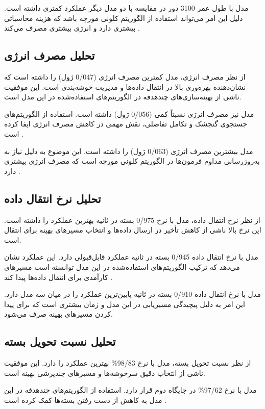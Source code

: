 \documentclass[12pt, onecolumn, a4paper]{article}
\begin{document}
مدل  با طول عمر 3100 دور در مقایسه با دو مدل دیگر عملکرد کمتری داشته است. دلیل این امر می‌تواند استفاده از الگوریتم کلونی مورچه باشد که هزینه محاسباتی بیشتری دارد و انرژی بیشتری مصرف می‌کند \cite{ref7}.

\subsection*{تحلیل مصرف انرژی}
از نظر مصرف انرژی، مدل  کمترین مصرف انرژی (0/047 ژول) را داشته است که نشان‌دهنده بهره‌وری بالا در انتقال داده‌ها و مدیریت خوشه‌بندی است. این موفقیت ناشی از بهینه‌سازی‌های چندهدفه در الگوریتم‌های استفاده‌شده در این مدل است.

مدل  نیز مصرف انرژی نسبتاً کمی (0/056 ژول) داشته است. استفاده از الگوریتم‌های جستجوی گنجشک و تکامل تفاضلی، نقش مهمی در کاهش مصرف انرژی ایفا کرده است \cite{ref5}.

مدل  بیشترین مصرف انرژی (0/063 ژول) را داشته است. این موضوع به دلیل نیاز به به‌روزرسانی مداوم فرمون‌ها در الگوریتم کلونی مورچه است که مصرف انرژی بیشتری دارد \cite{ref6}.

\subsection*{تحلیل نرخ انتقال داده}
از نظر نرخ انتقال داده، مدل  با نرخ 0/975 بسته در ثانیه بهترین عملکرد را داشته است. این نرخ بالا ناشی از کاهش تأخیر در ارسال داده‌ها و انتخاب مسیرهای بهینه برای انتقال است.

مدل  با نرخ انتقال داده 0/945 بسته در ثانیه عملکرد قابل‌قبولی دارد. این عملکرد نشان می‌دهد که ترکیب الگوریتم‌های استفاده‌شده در این مدل توانسته است مسیرهای کارآمدی برای انتقال داده‌ها پیدا کند \cite{ref5}.

مدل  با نرخ انتقال داده 0/910 بسته در ثانیه پایین‌ترین عملکرد را در میان سه مدل دارد. این امر به دلیل پیچیدگی مسیریابی در این مدل و زمان بیشتری است که برای پیدا کردن مسیرهای بهینه صرف می‌شود.

\subsection*{تحلیل نسبت تحویل بسته}
از نظر نسبت تحویل بسته، مدل  با نرخ 98/83\% بهترین عملکرد را دارد. این موفقیت ناشی از انتخاب دقیق سرخوشه‌ها و مسیرهای چندپرشی بهینه است.

مدل  با نرخ 97/62\% در جایگاه دوم قرار دارد. استفاده از الگوریتم‌های چندهدفه در این مدل به کاهش از دست رفتن بسته‌ها کمک کرده است \cite{ref6}.
\end{document}
